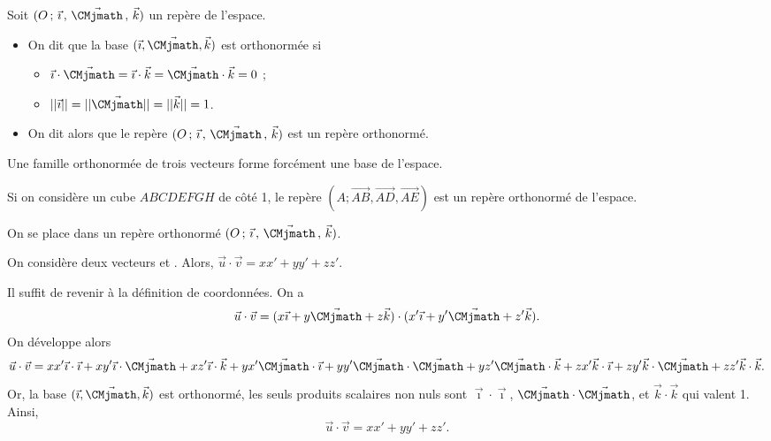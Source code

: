 \documentclass[11pt,fleqn, openany]{book} %
\begin{document}
\begin{definition}Soit $\Oijk$ un repère de l'espace.
\begin{itemize}
\item On dit que la base $(\vec{\imath}, \vec{\CMjmath}, \vec k)$ est orthonormée si
\begin{itemize}
\item $\vec{\imath} \cdot \vec{\CMjmath} = \vec{\imath} \cdot \vec k = \vec{\CMjmath} \cdot \vec k = 0$ ;
\item $\lvert\lvert\vec{\imath}\rvert\rvert=\lvert\lvert\vec{\CMjmath}\rvert\rvert=\lvert\lvert\vec k\rvert\rvert = 1$.
\end{itemize}
\item On dit alors que le repère $\Oijk$ est un repère orthonormé.
\end{itemize}\end{definition}

Une famille orthonormée de trois vecteurs forme forcément une base de l'espace.

\begin{example} Si on considère un cube $ABCDEFGH$ de côté 1, le repère $(A;\overrightarrow{AB},\overrightarrow{AD}, \overrightarrow{AE})$ est un repère orthonormé de l'espace.\end{example}

\begin{proposition}On se place dans un repère orthonormé $\Oijk$. 

On considère deux vecteurs \renewcommand{\arraystretch}{1} et \renewcommand{\arraystretch}{1}. Alors, $\vec u \cdot \vec v =xx'+yy'+zz'$.\end{proposition}

\begin{demonstration} Il suffit de revenir à la définition de coordonnées. On a
\[ \vec u \cdot \vec v = (x\vec{\imath} + y \vec{\CMjmath} + z \vec k) \cdot (x' \vec{\imath} + y' \vec{\CMjmath} + z' \vec k).\]
On développe alors
\[ \vec u \cdot \vec v = xx' \vec{\imath} \cdot \vec{\imath} +  xy' \vec{\imath} \cdot \vec{\CMjmath} +  xz' \vec{\imath} \cdot \vec k +  yx' \vec{\CMjmath} \cdot \vec{\imath} +  yy' \vec{\CMjmath} \cdot \vec{\CMjmath} +  yz' \vec{\CMjmath} \cdot \vec k +  zx' \vec k \cdot \vec{\imath} +  zy' \vec k \cdot \vec{\CMjmath} +  zz' \vec k \cdot \vec k .\]
Or, la base $(\vec{\imath}, \vec{\CMjmath}, \vec k)$ est orthonormé, les seuls produits scalaires non nuls sont $\vec{\imath} \cdot \vec{\imath}$, $\vec{\CMjmath} \cdot \vec{\CMjmath}$, et $\vec k \cdot \vec k$ qui valent 1. Ainsi, 
\[ \vec u \cdot \vec v =xx'+yy'+zz'.\]\vspace{-0.5cm}\end{demonstration}
\end{document}
